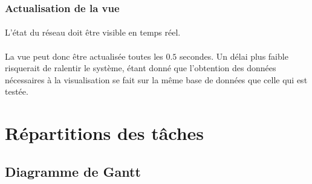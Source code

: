 \documentclass[12pt]{article}
\begin{document}
\subsubsection{Actualisation de la vue}

\paragraph{} L'état du réseau doit être visible en temps réel.

\paragraph{} La vue peut donc être actualisée toutes les $0.5$ secondes. 
Un délai plus faible risquerait de ralentir le système, étant donné que l'obtention des données nécessaires à la visualisation se fait sur la même base de données que celle qui est testée.


\newpage
\section{Répartitions des tâches}

\subsection{Diagramme de Gantt}
\end{document}
